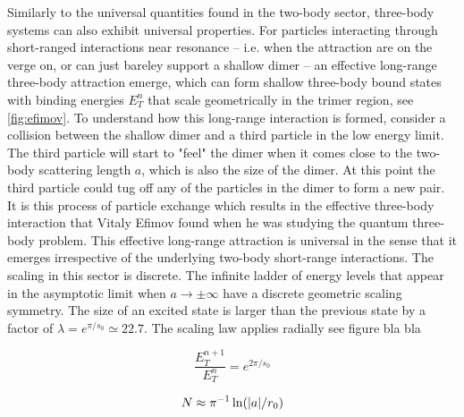 Similarly to the universal quantities found in the two-body sector, three-body systems can also exhibit universal properties. For particles interacting through short-ranged interactions near resonance -- i.e. when the attraction are on the verge on, or can just bareley support a shallow dimer -- an effective long-range three-body attraction emerge, which can form shallow three-body bound states with binding energies $E_T^n$ that scale geometrically in the trimer region, see \cref{fig:efimov}. To understand how this long-range interaction is formed, consider a collision between the shallow dimer and a third particle in the low energy limit. The third particle will start to "feel" the dimer when it comes close to the two-body scattering length $a$, which is also the size of the dimer. At this point the third particle could tug off any of the particles in the dimer to form a new pair. It is this process of particle exchange which results in the effective three-body interaction that Vitaly Efimov found when he was studying the quantum three-body problem. This effective long-range attraction is universal in the sense that it emerges irrespective of the underlying two-body short-range interactions. The scaling in this sector is discrete. The infinite ladder of energy levels that appear in the asymptotic limit when $a \to \pm \infty$ have a discrete geometric scaling symmetry. The size of an excited state is larger than the previous state by a factor of $\lambda = e^{\pi/s_0} \simeq 22.7$. The scaling law applies radially see figure bla bla %

\begin{equation}
\frac{E_T^{n+1}}{E_T^{n}} = e^{2\pi/s_0}
\end{equation}

\begin{equation}
N \approx \pi^{-1} \ln(\lvert a\rvert/r_0)
\end{equation}

